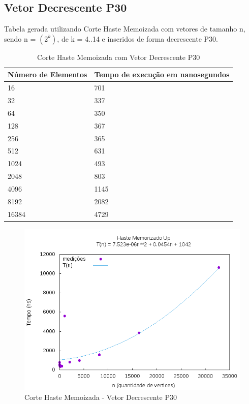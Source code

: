 \documentclass[12pt,a4paper,twoside]{report}
\begin{document}
\subsection{Vetor Decrescente P30}
Tabela gerada utilizando Corte Haste Memoizada com vetores de tamanho n, sendo n = $(2^k)$, de k = 4..14 e inseridos de forma decrescente P30.
\begin{table}[H]
\centering
\caption{Corte Haste Memoizada com Vetor Decrescente P30}
\label{my-label}
\begin{tabular}{|l|l|}
\hline
\multicolumn{1}{|c|}{\textbf{Número de Elementos}} & \multicolumn{1}{c|}{\textbf{Tempo de execução em nanosegundos}} \\ \hline
16 & 701 \\ \hline
32 & 337 \\ \hline
64 & 350 \\ \hline
128 & 367 \\ \hline
256 & 365 \\ \hline
512 & 631 \\ \hline
1024 & 493 \\ \hline
2048 & 803 \\ \hline
4096 & 1145 \\ \hline
8192 & 2082 \\ \hline
16384 & 4729 \\ \hline

\end{tabular}
\end{table}

\begin{figure}[H]
    \centering
    \includegraphics[width=0.7\linewidth]{graficos/CorteHasteMemorizado/DecrescenteP30/HasteMemo.png}
  \caption{Corte Haste Memoizada - Vetor Decrescente P30}
\end{figure}
\end{document}
